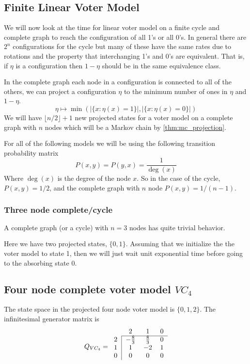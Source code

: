 \documentclass{article}
\theoremstyle{plain}
\theoremstyle{definition}
\theoremstyle{remark}
\numberwithin{equation}{section}
\begin{document}
\subsection{Finite Linear Voter Model}
We will now look at the time for linear voter model on a finite cycle and complete graph to reach the configuration of all 1's or all 0's.
In general there are $2^n$ configurations for the cycle but many of these have the same rates due to rotations and the property that interchanging 1's and 0's are equivalent.
That is, if $\eta$ is a configuration then $1 - \eta$ should be in the same equivalence class.

In the complete graph each node in a configuration is connected to all of the others, we can project a configuration $\eta$ to the minimum number of ones in $\eta$ and $1 - \eta$.
$$
\eta \mapsto \min\left(|\{x : \eta(x) = 1\}|, |\{x : \eta(x) = 0\}|  \right)
$$
We will have $\lfloor n/2 \rfloor + 1$ new projected states for a voter model on a complete graph with $n$ nodes which will be a Markov chain
by \ref{thm:mc_projection}.

For all of the following models we will be using the following transition probability matrix
$$
P(x,y) = P(y,x) = \frac{1}{\deg(x)}
$$
Where $\deg(x)$ is the degree of the node $x$.
So in the case of the cycle, $P(x,y) = 1/2$, and the complete graph with $n$ node $P(x,y) = 1/(n - 1)$.

\subsubsection{Three node complete/cycle}
A complete graph (or a cycle) with $n = 3$ nodes has quite trivial behavior.

Here we have two projected states, $\{0,1\}$.
Assuming that we initialize the the voter model to state 1, then we will just wait unit exponential time before going to the absorbing state 0.

\subsection{Four node complete voter model \texorpdfstring{$VC_4$}{VC4}}
The state space in the projected four node voter model is $\{0,1,2\}$.
The infinitesimal generator matrix is
$$
Q_{VC_4} = \begin{blockarray}{cccc}
    & 2 & 1 & 0\\
    \begin{block}{c|ccc}
        \cline{2-4}
        2 & -\frac{8}{3} & \frac{8}{3} & 0 \\
        1 & 1 & -2 & 1\\
        0 & 0 & 0 & 0\\
    \end{block}
\end{blockarray}
$$
\end{document}
